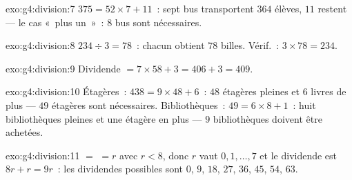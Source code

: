 \begin{solution}{exo:g4:division:7}
$375 = 52 \times 7 + 11$~: sept bus transportent $364$ élèves, $11$
restent --- le cas «~plus un~»~: $8$ bus sont nécessaires.
\end{solution}

\begin{solution}{exo:g4:division:8}
$234 \div 3 = 78$~: chacun obtient $78$ billes. Vérif.~:
$3 \times 78 = 234$.
\end{solution}

\begin{solution}{exo:g4:division:9}
Dividende $= 7 \times 58 + 3 = 406 + 3 = 409$.
\end{solution}

\begin{solution}{exo:g4:division:10}
Étagères~: $438 = 9 \times 48 + 6$~: $48$ étagères pleines et
$6$ livres de plus --- $49$ étagères sont nécessaires.
Bibliothèques~: $49 = 6 \times 8 + 1$~: huit bibliothèques pleines
et une étagère en plus --- $9$ bibliothèques doivent être achetées.
\end{solution}

\begin{solution}{exo:g4:division:11}
 $=$  $= r$ avec $r < 8$, donc $r$ vaut
$0, 1, \dots, 7$ et le dividende est $8r + r = 9r$~: les
dividendes possibles sont $0$, $9$, $18$, $27$, $36$, $45$, $54$,
$63$.
\end{solution}

